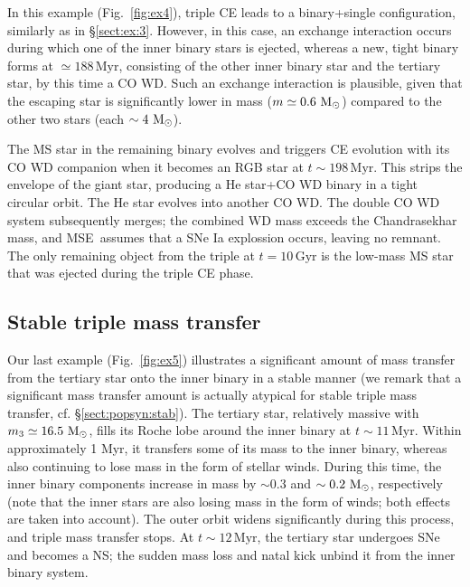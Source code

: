 \documentclass[twocolumn,appendixfloats,tighten]{aastex631}
\def\msun{{\rm\,M_\odot}}
\newcommand{\F}{Fig.}
\newcommand{\myr}{\mathrm{Myr}}
\newcommand{\gyr}{\mathrm{Gyr}}
\newcommand{\mse}{\textsc{MSE}}
\begin{document}
In this example (\F~\ref{fig:ex4}), triple CE leads to a binary+single configuration, similarly as in \S\ref{sect:ex:3}. However, in this case, an exchange interaction occurs during which one of the inner binary stars is ejected, whereas a new, tight binary forms at $\simeq 188\,\myr$, consisting of the other inner binary star and the tertiary star, by this time a CO WD. Such an exchange interaction is plausible, given that the escaping star is significantly lower in mass ($m\simeq 0.6\,\msun$) compared to the other two stars (each $\sim 4 \, \msun$). 

The MS star in the remaining binary evolves and triggers CE evolution with its CO WD companion when it becomes an RGB star at $t \sim 198\,\myr$. This strips the envelope of the giant star, producing a He star+CO WD binary in a tight circular orbit. The He star evolves into another CO WD. The double CO WD system subsequently merges; the combined WD mass exceeds the Chandrasekhar mass, and \mse~assumes that a SNe Ia explossion occurs, leaving no remnant. The only remaining object from the triple at $t=10\,\gyr$ is the low-mass MS star that was ejected during the triple CE phase.


\subsection{Stable triple mass transfer}
\label{sect:ex:5}

\begin{figure*}
\iftoggle{ApJFigs}{
\texttt{[image: system\_731\_mobile]}
}{
\texttt{[image: figs/system\_731\_mobile]}
}
\caption{Mobile diagrams for a system in which stable triple mass transfer occurs, and a significant amount of mass is accreted onto the inner binary.}
\label{fig:ex5}
\end{figure*}

Our last example (\F~\ref{fig:ex5}) illustrates a significant amount of mass transfer from the tertiary star onto the inner binary in a stable manner (we remark that a significant mass transfer amount is actually atypical for stable triple mass transfer, cf. \S\ref{sect:popsyn:stab}). The tertiary star, relatively massive with $m_3\simeq 16.5\,\msun$, fills its Roche lobe around the inner binary at $t\sim 11\,\myr$. Within approximately 1 Myr, it transfers some of its mass to the inner binary, whereas also continuing to lose mass in the form of stellar winds. During this time, the inner binary components increase in mass by $\sim 0.3$ and $\sim 0.2\,\msun$, respectively (note that the inner stars are also losing mass in the form of winds; both effects are taken into account). The outer orbit widens significantly during this process, and triple mass transfer stops. At $t\sim 12\,\myr$, the tertiary star undergoes SNe and becomes a NS; the sudden mass loss and natal kick unbind it from the inner binary system.
\end{document}
